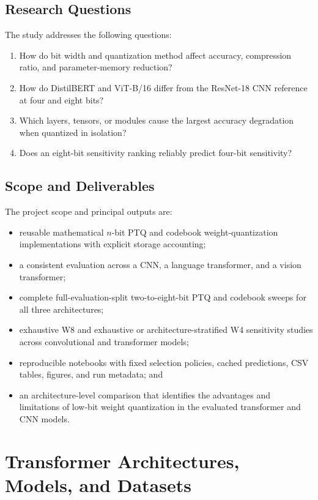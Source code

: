 \documentclass[conference]{IEEEtran}
\begin{document}
\subsection{Research Questions}

The study addresses the following questions:
\begin{enumerate}
    \item How do bit width and quantization method affect accuracy, compression ratio, and parameter-memory reduction?
    \item How do DistilBERT and ViT-B/16 differ from the ResNet-18 CNN reference at four and eight bits?
    \item Which layers, tensors, or modules cause the largest accuracy degradation when quantized in isolation?
    \item Does an eight-bit sensitivity ranking reliably predict four-bit sensitivity?
\end{enumerate}

\subsection{Scope and Deliverables}

The project scope and principal outputs are:
\begin{itemize}
    \item reusable mathematical $n$-bit PTQ and codebook weight-quantization implementations with explicit storage accounting;
    \item a consistent evaluation across a CNN, a language transformer, and a vision transformer;
    \item complete full-evaluation-split two-to-eight-bit PTQ and codebook sweeps for all three architectures;
    \item exhaustive W8 and exhaustive or architecture-stratified W4 sensitivity studies across convolutional and transformer models;
    \item reproducible notebooks with fixed selection policies, cached predictions, CSV tables, figures, and run metadata; and
    \item an architecture-level comparison that identifies the advantages and limitations of low-bit weight quantization in the evaluated transformer and CNN models.
\end{itemize}

\section{Transformer Architectures, Models, and Datasets}
\label{sec:models-datasets}
\end{document}
